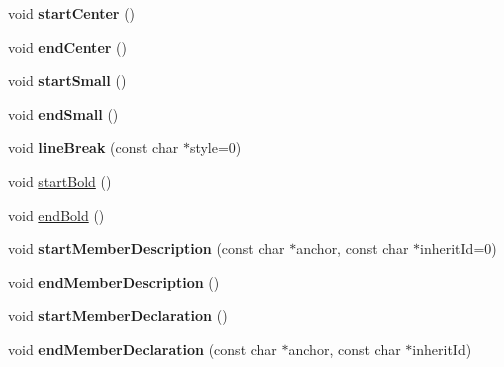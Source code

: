 \begin{DoxyCompactItemize}
\item 
\hypertarget{class_output_list_abdafeba989f102a3656f6b3341ddc79b}{void {\bfseries start\-Center} ()}\label{class_output_list_abdafeba989f102a3656f6b3341ddc79b}

\item 
\hypertarget{class_output_list_a3e879450d54b627a5d86065b831ca0ac}{void {\bfseries end\-Center} ()}\label{class_output_list_a3e879450d54b627a5d86065b831ca0ac}

\item 
\hypertarget{class_output_list_a3a61d98acef498d905bd2c3f070a02a1}{void {\bfseries start\-Small} ()}\label{class_output_list_a3a61d98acef498d905bd2c3f070a02a1}

\item 
\hypertarget{class_output_list_afd1e7cfc27d1c1aa0638c9c4f94ee469}{void {\bfseries end\-Small} ()}\label{class_output_list_afd1e7cfc27d1c1aa0638c9c4f94ee469}

\item 
\hypertarget{class_output_list_a8c56a0949062c0b6a199c9d9f16a67a5}{void {\bfseries line\-Break} (const char $\ast$style=0)}\label{class_output_list_a8c56a0949062c0b6a199c9d9f16a67a5}

\item 
void \hyperlink{class_output_list_a6f230bea6c80b0a1847a9608c88fd45a}{start\-Bold} ()
\item 
void \hyperlink{class_output_list_a1e1a209879148bfcb4b57ab294b37b90}{end\-Bold} ()
\item 
\hypertarget{class_output_list_afb918c1df08cac5747a4ff2d3d3a04c3}{void {\bfseries start\-Member\-Description} (const char $\ast$anchor, const char $\ast$inherit\-Id=0)}\label{class_output_list_afb918c1df08cac5747a4ff2d3d3a04c3}

\item 
\hypertarget{class_output_list_a0dd91ddf8c2ef96803ec72c46964fdfd}{void {\bfseries end\-Member\-Description} ()}\label{class_output_list_a0dd91ddf8c2ef96803ec72c46964fdfd}

\item 
\hypertarget{class_output_list_adc7e1ef5ab7013afb090683808aec804}{void {\bfseries start\-Member\-Declaration} ()}\label{class_output_list_adc7e1ef5ab7013afb090683808aec804}

\item 
\hypertarget{class_output_list_a01efe005797c900e146b39b5b7be446f}{void {\bfseries end\-Member\-Declaration} (const char $\ast$anchor, const char $\ast$inherit\-Id)}\label{class_output_list_a01efe005797c900e146b39b5b7be446f}


\end{DoxyCompactItemize}
